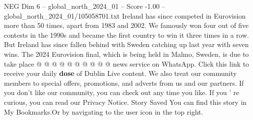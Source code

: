 \begin{textsample}{NEG Dim 6 – global\_north\_2024\_01 – Score -1.00 – global\_north\_2024\_01/105058701.txt}
Ireland has since competed in Eurovision more than 50 times, apart from 1983 and 2002.
We famously won four out of five contests in the 1990s and became the first country to win it three times in a row.
But Ireland has since fallen behind with Sweden catching up last year with seven wins.
The 2024 Eurovision final, which is being held in Malmo, Sweden, is due to take place @ @ @ @ @ @ @ @ @ @ news service on WhatsApp.
Click this link to receive your daily \textbf{dose} of Dublin Live content.
We also treat our community members to special offers, promotions, and adverts from us and our partners.
If you don't like our community, you can check out any time you like.
If you ' re curious, you can read our Privacy Notice.
Story Saved You can find this story in My Bookmarks.Or by navigating to the user icon in the top right.

\end{textsample}

